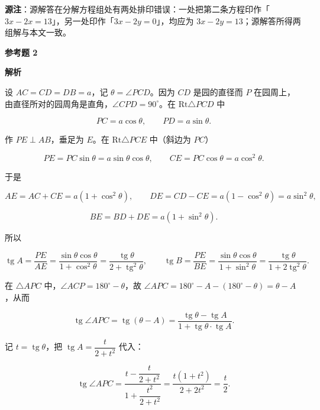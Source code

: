\begin{answer}
\begin{gktip}
\textbf{源注}：源解答在分解方程组处有两处排印错误：一处把第二条方程印作「$3x-2x=13$」，另一处印作「$3x-2y=0$」，均应为 $3x-2y=13$；源解答所得两组解与本文一致。
\end{gktip}

\textbf{参考题 2}

\textbf{解析}
\nopagebreak[4]
\begin{center}\end{center}
\nopagebreak[4]
设 $AC=CD=DB=a$，记 $\theta=\angle PCD$。因为 $CD$ 是园的直径而 $P$ 在园周上，由直径所对的园周角是直角，$\angle CPD=90^\circ$。在 $\mathrm{Rt}\triangle PCD$ 中

\nopagebreak[4]
\[
PC=a\cos\theta,
\qquad
PD=a\sin\theta.
\]

作 $PE\perp AB$，垂足为 $E$。在 $\mathrm{Rt}\triangle PCE$ 中（斜边为 $PC$）

\nopagebreak[4]
\[
PE=PC\sin\theta=a\sin\theta\cos\theta,
\qquad
CE=PC\cos\theta=a\cos^2\theta.
\]

于是

\nopagebreak[4]
\[
AE=AC+CE=a(1+\cos^2\theta),
\qquad
DE=CD-CE=a(1-\cos^2\theta)=a\sin^2\theta,
\]

\nopagebreak[4]
\[
BE=BD+DE=a(1+\sin^2\theta).
\]

所以

\nopagebreak[4]
\[
\operatorname{tg}A=\frac{PE}{AE}
=\frac{\sin\theta\cos\theta}{1+\cos^2\theta}
=\frac{\operatorname{tg}\theta}{2+\operatorname{tg}^2\theta},
\qquad
\operatorname{tg}B=\frac{PE}{BE}
=\frac{\sin\theta\cos\theta}{1+\sin^2\theta}
=\frac{\operatorname{tg}\theta}{1+2\operatorname{tg}^2\theta}.
\]

在 $\triangle APC$ 中，$\angle ACP=180^\circ-\theta$，故 $\angle APC=180^\circ-A-(180^\circ-\theta)=\theta-A$，从而

\nopagebreak[4]
\[
\operatorname{tg}\angle APC
=\operatorname{tg}(\theta-A)
=\frac{\operatorname{tg}\theta-\operatorname{tg}A}{1+\operatorname{tg}\theta\cdot\operatorname{tg}A}.
\]

记 $t=\operatorname{tg}\theta$，把 $\operatorname{tg}A=\dfrac{t}{2+t^2}$ 代入：

\nopagebreak[4]
\[
\operatorname{tg}\angle APC
=\frac{t-\dfrac{t}{2+t^2}}{1+\dfrac{t^2}{2+t^2}}
=\frac{t(1+t^2)}{2+2t^2}
=\frac{t}{2}.
\]


\end{answer}
